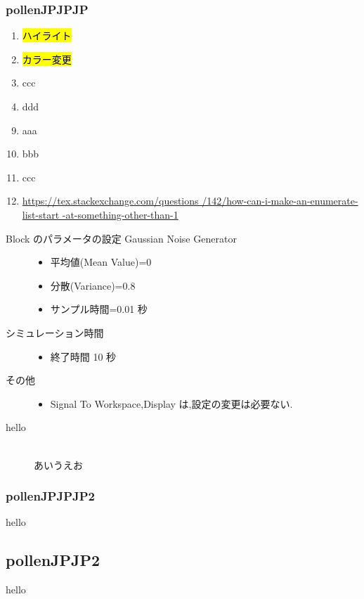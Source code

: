 \documentclass{jsarticle}           %
\theoremstyle{plain}
\theoremstyle{definition}
\theoremstyle{remark}
\newcommand{\HL}[1]{\hl{\mbox{#1}}}
\begin{document}
\subsubsection{pollenJPJPJP}
\begin{enumerate}
  \item \HL{ハイライト}
  \item \HL{カラー変更}
  \item ccc
  \item ddd
\end{enumerate}
\begin{enumerate}
  \setcounter{enumi}{8}
  \item aaa
  \item bbb
  \item ccc
  \item \url{https://tex.stackexchange.com/questions
              /142/how-can-i-make-an-enumerate-list-start
        -at-something-other-than-1}
\end{enumerate}
%
\begin{description}
  \item[Block のパラメータの設定 Gaussian Noise Generator]\mbox{}
  \begin{itemize}
    \item 平均値(Mean Value)=0
    \item 分散(Variance)=0.8
    \item サンプル時間=0.01 秒
  \end{itemize}
  \item[シミュレーション時間]\mbox{}
  \begin{itemize}
    \item 終了時間 10 秒
  \end{itemize}
  \item[その他]\mbox{}
  \begin{itemize}
    \item Signal To Workspace,Display は,設定の変更は必要ない.
  \end{itemize}
  \item[hello]\mbox{}\\
  あいうえお
\end{description}

\subsubsection{pollenJPJPJP2}
hello
\subsection{pollenJPJP2}
hello
    
\end{document}
